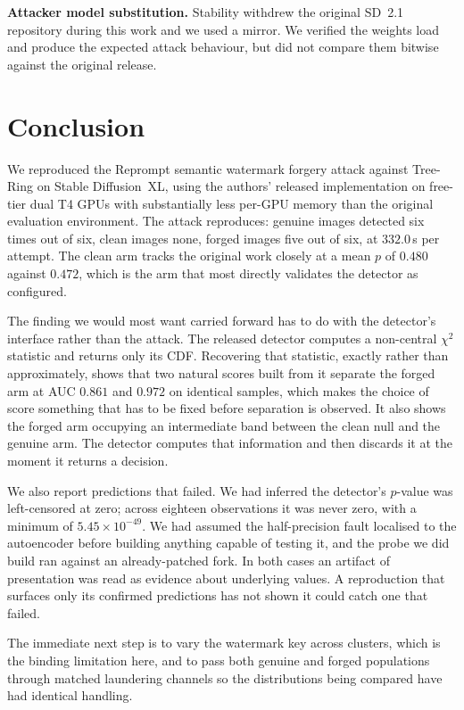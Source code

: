 \documentclass[10pt,twocolumn]{article}
\begin{document}
\textbf{Attacker model substitution.} Stability withdrew the original SD~2.1
repository during this work and we used a mirror. We verified the weights load and
produce the expected attack behaviour, but did not compare them bitwise against the
original release.

\section{Conclusion}

We reproduced the Reprompt semantic watermark forgery attack against Tree-Ring on
Stable Diffusion~XL, using the authors' released implementation on free-tier dual T4 GPUs with substantially less
per-GPU memory than the original evaluation environment. The attack
reproduces: genuine images detected six times out of six, clean images none, forged
images five out of six, at $332.0$\,s per attempt. The clean arm tracks the original
work closely at a mean $p$ of $0.480$ against $0.472$, which is the arm that most
directly validates the detector as configured.

The finding we would most want carried forward has to do with the detector's interface
rather than the attack. The released detector computes a non-central $\chi^2$
statistic and returns only its CDF. Recovering that statistic, exactly rather than
approximately, shows that two natural scores built from it separate the forged arm at
AUC $0.861$ and $0.972$ on identical samples, which makes the choice of score
something that has to be fixed before separation is observed. It also shows the forged
arm occupying an intermediate band between the clean null and the genuine arm.
The detector computes that information and then discards it at the moment it returns a
decision.

We also report predictions that failed. We had inferred the detector's $p$-value was
left-censored at zero; across eighteen observations it was never zero, with a minimum
of $5.45 \times 10^{-49}$. We had assumed the half-precision fault localised to the
autoencoder before building anything capable of testing it, and the probe we did build
ran against an already-patched fork. In both cases an artifact of presentation was
read as evidence about underlying values. A reproduction that surfaces only its
confirmed predictions has not shown it could catch one that failed.

The immediate next step is to vary the watermark key across clusters, which is the
binding limitation here, and to pass both genuine and forged populations through
matched laundering channels so the distributions being compared have had identical
handling.
\end{document}
